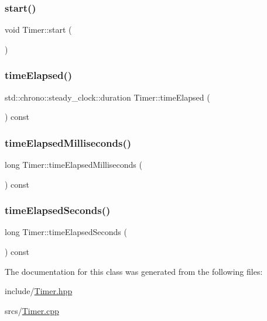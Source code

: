 \subsubsection{\texorpdfstring{start()}{start()}}
{\footnotesize\ttfamily void Timer\+::start (\begin{DoxyParamCaption}{ }\end{DoxyParamCaption})}

\mbox{\label{class_timer_a2ddb5fe1533752992785fb06e86b7c07}} 
\subsubsection{\texorpdfstring{time\+Elapsed()}{timeElapsed()}}
{\footnotesize\ttfamily std\+::chrono\+::steady\+\_\+clock\+::duration Timer\+::time\+Elapsed (\begin{DoxyParamCaption}{ }\end{DoxyParamCaption}) const}

\mbox{\label{class_timer_aee5dbd672b676eed86a5594f7072719e}} 
\subsubsection{\texorpdfstring{time\+Elapsed\+Milliseconds()}{timeElapsedMilliseconds()}}
{\footnotesize\ttfamily long Timer\+::time\+Elapsed\+Milliseconds (\begin{DoxyParamCaption}{ }\end{DoxyParamCaption}) const}

\mbox{\label{class_timer_ad15a9b6eff0680b58675e52a3959cb1d}} 
\subsubsection{\texorpdfstring{time\+Elapsed\+Seconds()}{timeElapsedSeconds()}}
{\footnotesize\ttfamily long Timer\+::time\+Elapsed\+Seconds (\begin{DoxyParamCaption}{ }\end{DoxyParamCaption}) const}



The documentation for this class was generated from the following files\+:\begin{DoxyCompactItemize}
\item 
include/\hyperlink{_timer_8hpp}{Timer.\+hpp}\item 
srcs/\hyperlink{_timer_8cpp}{Timer.\+cpp}\end{DoxyCompactItemize}
